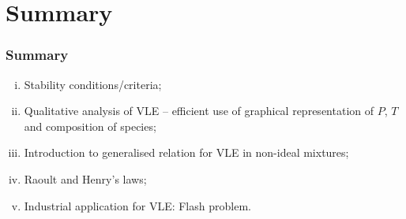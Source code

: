 \documentclass[10pt,compress,unknownkeysallowed]{beamer}
\begin{document}
\section{Summary}

\begin{frame}
 \frametitle{Summary}
   \begin{enumerate}[(i)]
     \item Stability conditions/criteria;
     \item Qualitative analysis of VLE -- efficient use of graphical representation of $P$, $T$ and composition of species;
     \item Introduction to generalised relation for VLE in non-ideal mixtures;
     \item Raoult and Henry's laws; 
     \item Industrial application for VLE: Flash problem.
   \end{enumerate}
\end{frame}
\end{document}
